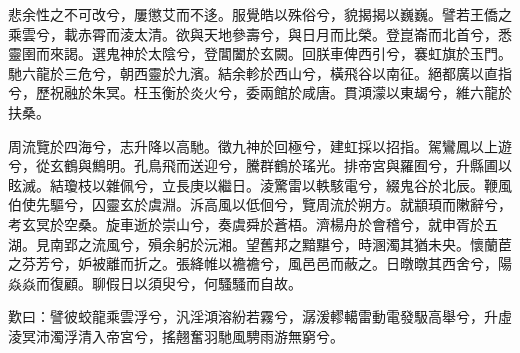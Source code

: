 
\begin{pinyinscope}
悲余性之不可改兮，屢懲艾而不迻。服覺皓以殊俗兮，貌揭揭以巍巍。譬若王僑之乘雲兮，載赤霄而淩太清。欲與天地參壽兮，與日月而比榮。登崑崙而北首兮，悉靈圉而來謁。選鬼神於太陰兮，登閶闔於玄闕。回朕車俾西引兮，褰虹旗於玉門。馳六龍於三危兮，朝西靈於九濱。結余軫於西山兮，橫飛谷以南征。絕都廣以直指兮，歷祝融於朱冥。枉玉衡於炎火兮，委兩館於咸唐。貫澒濛以東朅兮，維六龍於扶桑。

周流覽於四海兮，志升降以高馳。徵九神於回極兮，建虹採以招指。駕鸞鳳以上遊兮，從玄鶴與鷦明。孔鳥飛而送迎兮，騰群鶴於瑤光。排帝宮與羅囿兮，升縣圃以眩滅。結瓊枝以雜佩兮，立長庚以繼日。淩驚雷以軼駭電兮，綴鬼谷於北辰。鞭風伯使先驅兮，囚靈玄於虞淵。泝高風以低佪兮，覽周流於朔方。就顓頊而敶辭兮，考玄冥於空桑。旋車逝於崇山兮，奏虞舜於蒼梧。濟楊舟於會稽兮，就申胥於五湖。見南郢之流風兮，殞余躬於沅湘。望舊邦之黯黮兮，時溷濁其猶未央。懷蘭茞之芬芳兮，妒被離而折之。張絳帷以襜襜兮，風邑邑而蔽之。日暾暾其西舍兮，陽焱焱而復顧。聊假日以須臾兮，何騷騷而自故。

歎曰：譬彼蛟龍乘雲浮兮，汎淫澒溶紛若霧兮，潺湲轇轕雷動電發馺高舉兮，升虛淩冥沛濁浮清入帝宮兮，搖翹奮羽馳風騁雨游無窮兮。


\end{pinyinscope}